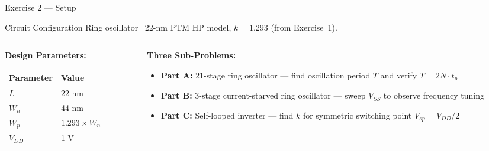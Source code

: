 \documentclass[aspectratio=169, 11pt]{beamer}
\begin{document}
\begin{frame}{Exercise 2 — Setup}
    \begin{block}{Circuit Configuration}
        Ring oscillator \textemdash\ 22-nm PTM HP model, $k = 1.293$ (from Exercise~1).
    \end{block}
    \vspace{0.4em}
    \begin{columns}[T]
        \begin{column}{0.45\textwidth}
            \textbf{Design Parameters:}
            \begin{table}
                \centering
                \begin{tabular}{@{}ll@{}}
                    \toprule
                    Parameter & Value \\
                    \midrule
                    $L$ & 22 nm \\
                    $W_n$ & 44 nm \\
                    $W_p$ & $1.293 \times W_n$ \\
                    $V_{DD}$ & 1 V \\
                    \bottomrule
                \end{tabular}
            \end{table}
        \end{column}
        \begin{column}{0.52\textwidth}
            \textbf{Three Sub-Problems:}
            \begin{itemize}
                \item \textbf{Part A:} 21-stage ring oscillator — find oscillation period $T$ and verify $T = 2N \cdot t_p$
                \item \textbf{Part B:} 3-stage current-starved ring oscillator — sweep $V_{SS}$ to observe frequency tuning
                \item \textbf{Part C:} Self-looped inverter — find $k$ for symmetric switching point $V_{sp} = V_{DD}/2$
            \end{itemize}
        \end{column}
    \end{columns}
\end{frame}
\end{document}
